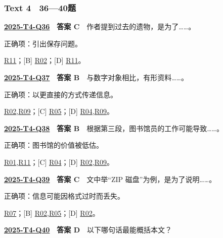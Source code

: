 \documentclass[11pt,a4paper]{article}
\begin{document}
\subsubsection{Text 4　36—40题}
\label{idx-2025-T4-Q36}
\noindent\textbf{\href{https://zj139.github.io/math-notes/english/2d3b4c55b3c8d254540a4e16/\#q36}{2025-T4-Q36}　答案 C}　作者提到过去的遗物，是为了……。\par\nopagebreak
\noindent 正确项：引出保存问题。\par\nopagebreak
\noindent [A] \hyperref[cat-R11]{R11}；[B] \hyperref[cat-R02]{R02}；[D] \hyperref[cat-R11]{R11}。
\par\smallskip
{}\label{idx-2025-T4-Q37}
\noindent\textbf{\href{https://zj139.github.io/math-notes/english/2d3b4c55b3c8d254540a4e16/\#q37}{2025-T4-Q37}　答案 B}　与数字对象相比，有形资料……。\par\nopagebreak
\noindent 正确项：以更直接的方式传递信息。\par\nopagebreak
\noindent [A] \hyperref[cat-R02]{R02},\hyperref[cat-R09]{R09}；[C] \hyperref[cat-R05]{R05}；[D] \hyperref[cat-R04]{R04},\hyperref[cat-R09]{R09}。
\par\smallskip
{}\label{idx-2025-T4-Q38}
\noindent\textbf{\href{https://zj139.github.io/math-notes/english/2d3b4c55b3c8d254540a4e16/\#q38}{2025-T4-Q38}　答案 B}　根据第三段，图书馆员的工作可能导致……。\par\nopagebreak
\noindent 正确项：图书馆的价值被低估。\par\nopagebreak
\noindent [A] \hyperref[cat-R01]{R01},\hyperref[cat-R11]{R11}；[C] \hyperref[cat-R04]{R04}；[D] \hyperref[cat-R02]{R02},\hyperref[cat-R09]{R09}。
\par\smallskip
{}\label{idx-2025-T4-Q39}
\noindent\textbf{\href{https://zj139.github.io/math-notes/english/2d3b4c55b3c8d254540a4e16/\#q39}{2025-T4-Q39}　答案 C}　文中举“ZIP 磁盘”为例，是为了说明……。\par\nopagebreak
\noindent 正确项：信息可能因格式过时而丢失。\par\nopagebreak
\noindent [A] \hyperref[cat-R07]{R07}；[B] \hyperref[cat-R02]{R02},\hyperref[cat-R05]{R05}；[D] \hyperref[cat-R02]{R02}。
\par\smallskip
{}\label{idx-2025-T4-Q40}
\noindent\textbf{\href{https://zj139.github.io/math-notes/english/2d3b4c55b3c8d254540a4e16/\#q40}{2025-T4-Q40}　答案 D}　以下哪句话最能概括本文？\par\nopagebreak
\end{document}
